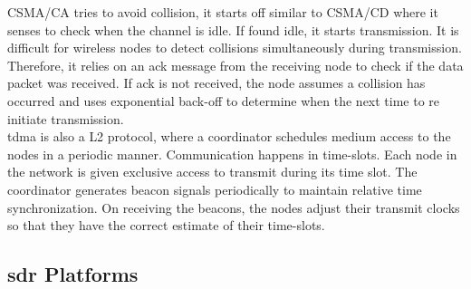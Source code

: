\ac{CSMA/CA} tries to avoid collision, it starts off similar to \ac{CSMA/CD} where it senses to check when the channel is idle.
If found idle, it starts transmission.
It is difficult for wireless nodes to detect collisions simultaneously during transmission.
Therefore, it relies on an \ac{ack} message from the receiving node to check if the data packet was received.
If \ac{ack} is not received, the node assumes a collision has occurred and  uses exponential back-off to determine when the next time to re initiate transmission.\\


\ac{tdma} is also a \ac{L2} protocol, where a coordinator schedules medium access to the nodes in a periodic manner.
Communication happens in time-slots.
Each node in the network is given exclusive access to transmit during its time slot.
The coordinator generates beacon signals periodically to maintain relative time synchronization. On receiving the beacons, the nodes adjust their transmit clocks so that they have the correct estimate of their time-slots.
 
 

\subsection{\ac{sdr} Platforms}

